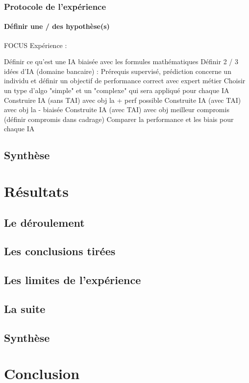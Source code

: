\documentclass[10pt, french, a4paper]{article}
\begin{document}
\subsubsection{Protocole de l'expérience}

\paragraph{Définir une / des hypothèse(s)}

FOCUS Expérience :

Définir ce qu'est une IA biaisée avec les formules mathématiques
Définir 2 / 3 idées d'IA (domaine bancaire) : Prérequis supervisé, prédiction concerne un individu et définir un objectif de performance correct avec expert métier
Choisir un type d'algo "simple" et un "complexe" qui sera appliqué pour chaque IA
Construire IA (sans TAI) avec obj la + perf possible
Construite IA (avec TAI) avec obj la - biaisée
Construite IA (avec TAI) avec obj meilleur compromis (définir compromis dans cadrage)
Comparer la performance et les biais pour chaque IA

\subsection{Synthèse}


\newpage
\section{Résultats}


\subsection{Le déroulement}


\subsection{Les conclusions tirées}


\subsection{Les limites de l'expérience}


\subsection{La suite}

\subsection{Synthèse}


\newpage
\section{Conclusion}

\newpage
% 


\end{document}
